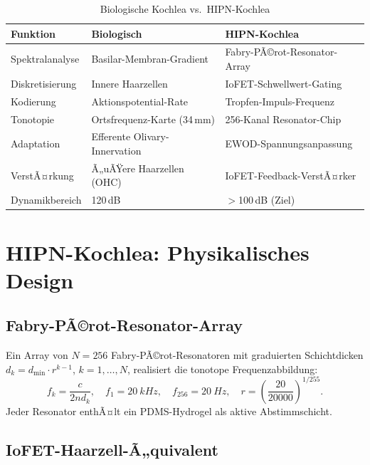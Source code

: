 ﻿\documentclass[a4paper,12pt]{scrreprt}
\theoremstyle{definition}
\begin{document}
\begin{table}[H]
\caption{Biologische Kochlea vs.\ HIPN-Kochlea}
\label{tab:nf6_vergleich}
\begin{tabular}{lll}
\toprule
\textbf{Funktion} & \textbf{Biologisch} & \textbf{HIPN-Kochlea} \\
\midrule
Spektralanalyse    & Basilar-Membran-Gradient      & Fabry-PÃ©rot-Resonator-Array \\
Diskretisierung    & Innere Haarzellen             & IoFET-Schwellwert-Gating \\
Kodierung          & Aktionspotential-Rate         & Tropfen-Impuls-Frequenz \\
Tonotopie          & Ortsfrequenz-Karte (34\,mm)   & 256-Kanal Resonator-Chip \\
Adaptation         & Efferente Olivary-Innervation & EWOD-Spannungsanpassung \\
VerstÃ¤rkung        & Ã„uÃŸere Haarzellen (OHC)       & IoFET-Feedback-VerstÃ¤rker \\
Dynamikbereich     & 120\,dB                       & $>$100\,dB (Ziel) \\
\bottomrule
\end{tabular}
\end{table}

\section{HIPN-Kochlea: Physikalisches Design}

\subsection{Fabry-PÃ©rot-Resonator-Array}

Ein Array von $N=256$ Fabry-PÃ©rot-Resonatoren mit graduierten
Schichtdicken $d_k = d_{\min} \cdot r^{k-1}$, $k=1,\ldots,N$,
realisiert die tonotope Frequenzabbildung:
\[
  f_k = \frac{c}{2 n d_k}, \quad f_1 = \SI{20}{kHz},
  \quad f_{256} = \SI{20}{Hz}, \quad r = \left(\frac{20}{20000}\right)^{1/255}.
\]
Jeder Resonator enthÃ¤lt ein PDMS-Hydrogel als aktive Abstimmschicht.

\subsection{IoFET-Haarzell-Ã„quivalent}
\end{document}
